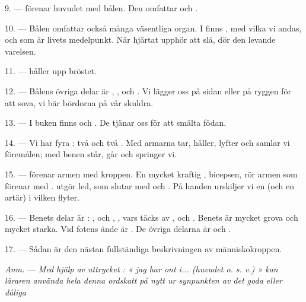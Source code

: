 \VUsaut{4.4mm}
\VUsaut{3.0mm}

9. ---  förenar huvudet med bålen. Den omfattar  och
.

10. --- Bålen omfattar också många väsentliga organ. I  finns
, med vilka vi andas, och  som är livets
medelpunkt. När hjärtat upphör att slå, dör den levande varelsen.

11. ---  håller upp bröstet.

12. --- Bålens övriga delar är , ,
 och . Vi lägger oss på sidan eller på ryggen
för att sova, vi bär bördorna på vår skuldra.

13. --- I buken finns  och . De tjänar oss för att smälta
födan.

\VUsaut{4.4mm}
\VUsaut{3.0mm}

14. --- Vi har fyra  : två  och två . Med armarna
tar, håller, lyfter och samlar vi föremålen; med benen står, går och springer vi.

15. ---  förenar armen med kroppen. En mycket kraftig
, bicepsen, rör armen som  förenar med
.  utgör  led, som slutar
med  och . På handen urskiljer vi en
 (och en artär) i vilken  flyter.

16. --- Benets delar är : ,  och ,
, vars  täcks av , 
och . Benets  är mycket grova och mycket starka. Vid fotens ände är
. De övriga delarna är  och
.

17. --- Sådan är den nästan fullständiga beskrivningen av människokroppen.

\textit{Anm.} --- \textit{Med hjälp av uttrycket : « jag har ont i... (huvudet o. s. v.) » kan
läraren använda hela denna ordskatt på nytt ur synpunkten av det goda eller dåliga}

\VUsaut{5.0mm}
\VUsaut{2.4mm}
\VUsaut{3.0mm}

